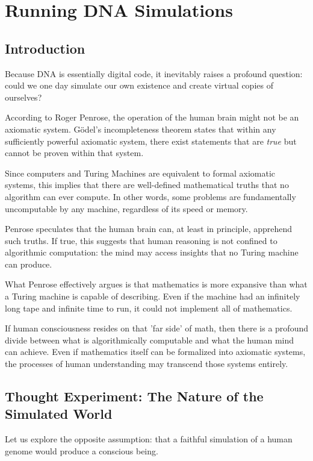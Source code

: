 \chapter{Running DNA Simulations}
\label{chap:running-dna-simulation}

\section*{Introduction}

Because DNA is essentially digital code, it inevitably raises a profound question: could we one day simulate our own existence and create virtual copies of ourselves?

According to Roger Penrose, the operation of the human brain might not be an axiomatic system.
G\"odel's incompleteness theorem states that within any sufficiently powerful axiomatic system, there exist statements that are \emph{true} but cannot be proven within that system. 

Since computers and Turing Machines are equivalent to formal axiomatic systems, this implies that there are well-defined mathematical truths that no algorithm can ever compute.
In other words, some problems are fundamentally uncomputable by any machine, regardless of its speed or memory.

Penrose speculates that the human brain can, at least in principle, apprehend such truths.
If true, this suggests that human reasoning is not confined to algorithmic computation: the mind may access insights that no Turing machine can produce.  

What Penrose effectively argues is that mathematics is more expansive than what a Turing machine is capable of describing.
Even if the machine had an infinitely long tape and infinite time to run, it could not implement all of mathematics. 

If human consciousness resides on that 'far side' of math, then there is a profound divide between what is algorithmically computable and what the human mind can achieve.
Even if mathematics itself can be formalized into axiomatic systems, the processes of human understanding may transcend those systems entirely. 


\section*{Thought Experiment: The Nature of the Simulated World}

Let us explore the opposite assumption: that a faithful simulation of a human genome would produce a conscious being.

